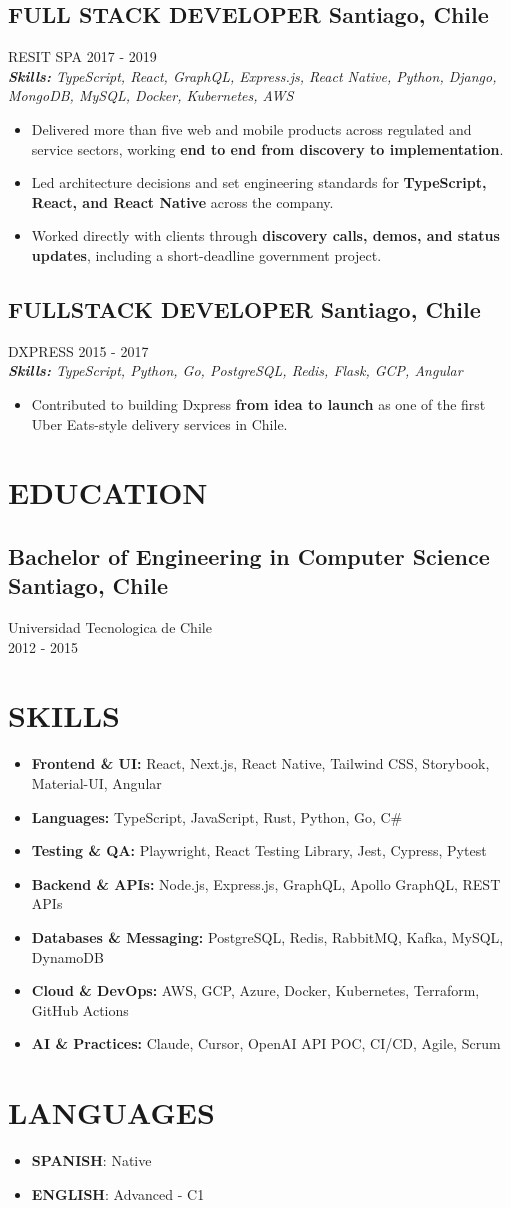 \documentclass{article}
\newcommand{\SubHeading}[1]{
   \subsection*{#1}\vspace{-0.5em}
}
\newcommand{\WorkExperience}[2]{
   \subsection*{#1}
   \vspace{-1em}
   \uppercase{#2}
}
\newcommand{\Skills}[1]{
   \textit{\textbf{Skills:} #1}
}
\begin{document}
\WorkExperience{FULL STACK DEVELOPER \hfill Santiago, Chile}{Resit SPA \hfill 2017 {-} 2019} \\
\Skills{TypeScript, React, GraphQL, Express.js, React Native, Python, Django, MongoDB, MySQL, Docker, Kubernetes, AWS}
\begin{itemize}
	\item Delivered more than five web and mobile products across regulated and service sectors, working \textbf{end to end from discovery to implementation}.
	\item Led architecture decisions and set engineering standards for \textbf{TypeScript, React, and React Native} across the company.
	\item Worked directly with clients through \textbf{discovery calls, demos, and status updates}, including a short-deadline government project.
\end{itemize}

\WorkExperience{FULLSTACK DEVELOPER \hfill Santiago, Chile}{Dxpress \hfill 2015 {-} 2017} \\
\Skills{TypeScript, Python, Go, PostgreSQL, Redis, Flask, GCP, Angular}
\begin{itemize}
	\item Contributed to building Dxpress \textbf{from idea to launch} as one of the first Uber Eats-style delivery services in Chile.
\end{itemize}

\section*{EDUCATION}
\SubHeading{Bachelor of Engineering in Computer Science \hfill Santiago, Chile}
Universidad Tecnologica de Chile \\[0.1em]
2012 {-} 2015

\section*{SKILLS}
\begin{itemize}
	\item \textbf{Frontend \& UI:} React, Next.js, React Native, Tailwind CSS, Storybook, Material-UI, Angular
	\item \textbf{Languages:} TypeScript, JavaScript, Rust, Python, Go, C\#
	\item \textbf{Testing \& QA:} Playwright, React Testing Library, Jest, Cypress, Pytest
	\item \textbf{Backend \& APIs:} Node.js, Express.js, GraphQL, Apollo GraphQL, REST APIs
	\item \textbf{Databases \& Messaging:} PostgreSQL, Redis, RabbitMQ, Kafka, MySQL, DynamoDB
	\item \textbf{Cloud \& DevOps:} AWS, GCP, Azure, Docker, Kubernetes, Terraform, GitHub Actions
	\item \textbf{AI \& Practices:} Claude, Cursor, OpenAI API POC, CI/CD, Agile, Scrum
\end{itemize}

\section*{LANGUAGES}
\begin{itemize}[left=0pt]
	\item \textbf{SPANISH}: Native
	\item \textbf{ENGLISH}: Advanced {-} C1
\end{itemize}
\end{document}
